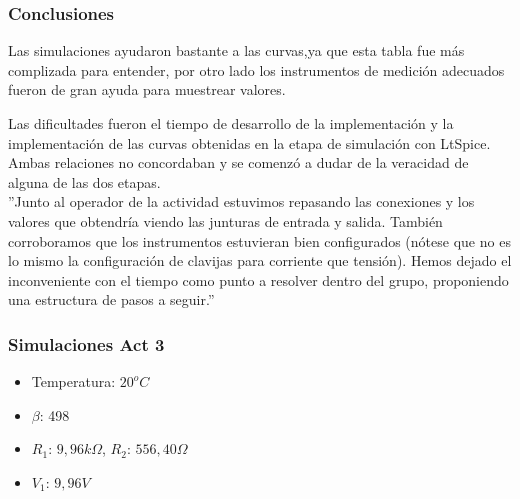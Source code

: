 \subsubsection{Conclusiones}

\sangria Las simulaciones ayudaron bastante a las curvas,ya que esta tabla fue más complizada para entender, por otro lado los instrumentos de medición adecuados fueron de gran ayuda para muestrear valores.

\sangria Las dificultades fueron el tiempo de desarrollo de la implementación y la implementación de las curvas obtenidas en la etapa de simulación con LtSpice. Ambas relaciones no concordaban y se comenzó a dudar de la veracidad de alguna de las dos etapas. \\
\sangria{} ''Junto al operador de la actividad estuvimos repasando las conexiones y los valores que obtendría viendo las junturas de entrada y salida. También corroboramos que los instrumentos estuvieran bien configurados (nótese que no es lo mismo la configuración de clavijas para corriente que tensión). Hemos dejado el inconveniente con el tiempo como punto a resolver dentro del grupo, proponiendo una estructura de pasos a seguir.''
\thispagestyle{fancy}
\valentinoQuitaLasColumnas{}
\subsubsection{Simulaciones Act 3}
\begin{itemize}
    \item Temperatura: $20^oC$
    \item $\beta$: 498
    \item $R_1$: $9,96k\Omega$, $R_2$: $556,40\Omega$ 
    \item $V_1$: $9,96V$
\end{itemize}

